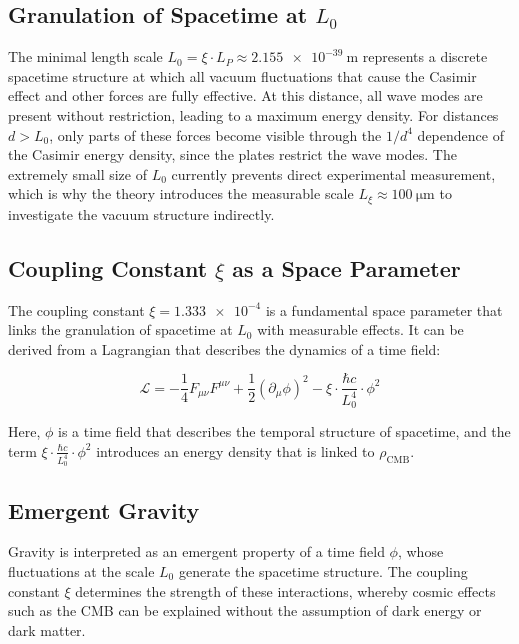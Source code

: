 	\subsection{Granulation of Spacetime at \( L_0 \)}
	
	The minimal length scale \( L_0 = \xi \cdot L_P \approx \SI{2.155e-39}{\meter} \) represents a discrete spacetime structure at which all vacuum fluctuations that cause the Casimir effect and other forces are fully effective. At this distance, all wave modes are present without restriction, leading to a maximum energy density. For distances \( d > L_0 \), only parts of these forces become visible through the \( 1/d^4 \) dependence of the Casimir energy density, since the plates restrict the wave modes. The extremely small size of \( L_0 \) currently prevents direct experimental measurement, which is why the theory introduces the measurable scale \( L_\xi \approx \SI{100}{\micro\meter} \) to investigate the vacuum structure indirectly.
	
	\subsection{Coupling Constant \( \xi \) as a Space Parameter}
	
	The coupling constant \( \xi = \num{1.333e-4} \) is a fundamental space parameter that links the granulation of spacetime at \( L_0 \) with measurable effects. It can be derived from a Lagrangian that describes the dynamics of a time field:
	
	\begin{equation}
		\mathcal{L} = -\frac{1}{4} F_{\mu\nu} F^{\mu\nu} + \frac{1}{2} (\partial_\mu \phi)^2 - \xi \cdot \frac{\hbar c}{L_0^4} \cdot \phi^2 \label{eq:lagrangian}
	\end{equation}
	
	Here, \( \phi \) is a time field that describes the temporal structure of spacetime, and the term \( \xi \cdot \frac{\hbar c}{L_0^4} \cdot \phi^2 \) introduces an energy density that is linked to \( \rho_{\text{CMB}} \).
	
	\subsection{Emergent Gravity}
	
	Gravity is interpreted as an emergent property of a time field \( \phi \), whose fluctuations at the scale \( L_0 \) generate the spacetime structure. The coupling constant \( \xi \) determines the strength of these interactions, whereby cosmic effects such as the CMB can be explained without the assumption of dark energy or dark matter.

